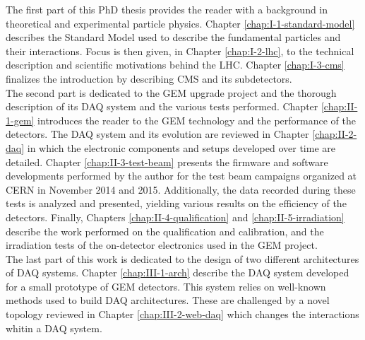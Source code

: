   The first part of this PhD thesis provides the reader with a background in theoretical and experimental particle physics. Chapter \ref{chap:I-1-standard-model} describes the Standard Model used to describe the fundamental particles and their interactions. Focus is then given, in Chapter \ref{chap:I-2-lhc}, to the technical description and scientific motivations behind the LHC. Chapter \ref{chap:I-3-cms} finalizes the introduction by describing CMS and its subdetectors. \\

  The second part is dedicated to the GEM upgrade project and the thorough description of its DAQ system and the various tests performed. Chapter \ref{chap:II-1-gem} introduces the reader to the GEM technology and the performance of the detectors. The DAQ system and its evolution are reviewed in Chapter \ref{chap:II-2-daq} in which the electronic components and setups developed over time are detailed. Chapter \ref{chap:II-3-test-beam} presents the firmware and software developments performed by the author for the test beam campaigns organized at CERN in November 2014 and 2015. Additionally, the data recorded during these tests is analyzed and presented, yielding various results on the efficiency of the detectors. Finally, Chapters \ref{chap:II-4-qualification} and \ref{chap:II-5-irradiation} describe the work performed on the qualification and calibration, and the irradiation tests of the on-detector electronics used in the GEM project. \\

  The last part of this work is dedicated to the design of two different architectures of DAQ systems. Chapter \ref{chap:III-1-arch} describe the DAQ system developed for a small prototype of GEM detectors. This system relies on well-known methods used to build DAQ architectures. These are challenged by a novel topology reviewed in Chapter \ref{chap:III-2-web-daq} which changes the interactions whitin a DAQ system.
